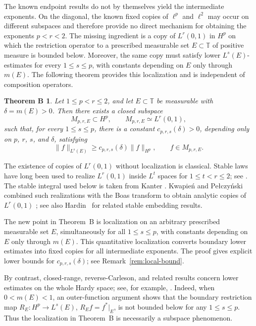 \documentclass[10pt,a4paper]{amsart}
\newtheorem*{theoremB}{Theorem B}
\newcommand{\T}{\mathbb{T}}
\begin{document}
The known endpoint results do not by themselves yield the intermediate
exponents. On the diagonal, the known fixed copies of \(\ell^p\) and
\(\ell^2\) may occur on different subspaces and therefore provide no
direct mechanism for obtaining the exponents \(p<r<2\). The missing
ingredient is a copy of \(L^r(0,1)\) in \(H^p\) on which the
restriction operator to a prescribed measurable set
\(E\subset\T\) of positive measure is bounded below. Moreover, the
same copy must satisfy lower \(L^s(E)\)-estimates for every
\(1\le s\le p\), with constants depending on \(E\) only through
\(m(E)\). The following theorem provides this localization and is
independent of composition operators.

\begin{theoremB}
Let \(1\le p<r\le2\), and let \(E\subset\T\) be measurable with \(\delta=m(E)>0\). Then there exists a closed subspace
\[
        M_{p,r,E}\subset H^p,
        \qquad
        M_{p,r,E}\simeq L^r(0,1),
\]
such that, for every \(1\le s\le p\), there is a constant \(c_{p,r,s}(\delta)>0\), depending only on \(p\), \(r\), \(s\), and \(\delta\), satisfying
\[
        \|f\|_{L^s(E)}
        \ge
        c_{p,r,s}(\delta)\|f\|_{H^p},
        \qquad
        f\in M_{p,r,E}.
\]
\end{theoremB}

The existence of copies of \(L^r(0,1)\) without localization is
classical. Stable laws have long been used to realize \(L^r(0,1)\)
inside \(L^t\) spaces for \(1\le t<r\le2\); see
\cite{BretagnolleDacunhaCastelleKrivine1966}. The stable integral
used below is taken from Kanter
\cite[Sections~4--5 and the theorem, pp.~405--406]{Kanter1973}.
Kwapie\'n and Pe{\l}czy\'nski combined such realizations with the
Boas transform to obtain analytic copies of \(L^r(0,1)\)
\cite[Proposition~2.1 and its proof]{KwapienPelczynski1976};
see also Hardin~\cite{Hardin1982} for related stable embedding
results.

The new point in Theorem~B is localization on an arbitrary prescribed
measurable set \(E\), simultaneously for all \(1\le s\le p\), with
constants depending on \(E\) only through \(m(E)\). This quantitative
localization converts boundary lower estimates into fixed copies for
all intermediate exponents. The proof gives explicit lower bounds for
\(c_{p,r,s}(\delta)\); see Remark~\ref{rem:local-bound}.

By contrast, closed-range, reverse-Carleson, and related results
concern lower estimates on the whole Hardy space; see, for example,
\cite{CimaThomsonWogen1974,Zorboska1994,
LefevreLiQueffelecRodriguezPiazza2012,
HartmannMassanedaNicolauOrtegaCerda2014,
ChalendarPartington2019,Dyakonov2025}.
Indeed, when \(0<m(E)<1\), an outer-function argument shows that the
boundary restriction map
\(R_E:H^p\to L^s(E)\), \(R_Ef=f^*|_E\), is not bounded below for any
\(1\le s\le p\). Thus the localization in Theorem~B is necessarily a
subspace phenomenon.
\end{document}
